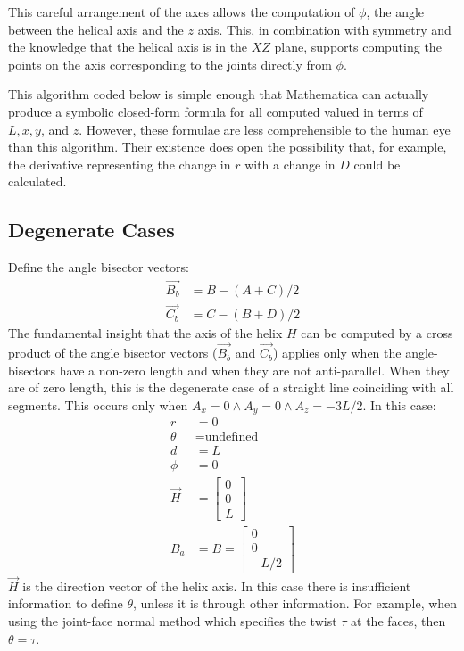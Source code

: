 \documentclass[mathematics,article,submit,pdftex,moreauthors]{Definitions/mdpi}
\begin{document}
This careful arrangement of the axes
allows the computation of $\phi$, the angle between the helical axis
and the $z$ axis. This, in combination with symmetry and the knowledge
that the helical axis is in the $XZ$ plane, supports computing the
points on the axis corresponding to the joints directly from $\phi$.

This algorithm coded below is simple enough that Mathematica \cite{Mathematica} can
actually produce a symbolic closed-form formula for all computed valued
in terms of $L, x, y$, and $z$.
However, these formulae are less comprehensible to the
human eye than this algorithm.
Their existence does open
the possibility that, for example, the derivative representing
the change in $r$ with a change in $D$ could be calculated.

\subsection{Degenerate Cases}

Define the angle bisector vectors:
\begin{align}
  \overrightarrow{B_b} &= B - (A + C)/2 \\
  \overrightarrow{C_b} &= C - (B + D)/2
  \end{align}
The fundamental insight that the axis of the helix $H$ can be
computed by a cross product of the angle bisector
vectors ($\overrightarrow{B_b}$ and $\overrightarrow{C_b}$) applies only
when the angle-bisectors have a non-zero length and when
they are not anti-parallel. When they are of zero length, this is
the degenerate case of a straight line coinciding with all segments.
This occurs only when $A_x = 0 \wedge A_y = 0 \wedge A_z = -3L/2$.
In this case:
\begin{align}
  r &= 0 \\
  \theta &= \text{undefined}\\
  d &= L \\
  \phi &= 0 \\
  \overrightarrow{H} &=  \begin{bmatrix} 0 \\ 0 \\ L  \end{bmatrix} \\
  B_a &= B = \begin{bmatrix} 0 \\ 0 \\ -L/2  \end{bmatrix}
\end{align}
$\overrightarrow{H}$ is the direction vector of the helix axis.
In this case there is insufficient information to define $\theta$,
unless it is through other information. For example, when using
the joint-face normal method which specifies
the twist $\tau$ at the faces, then $\theta = \tau$.
\end{document}
